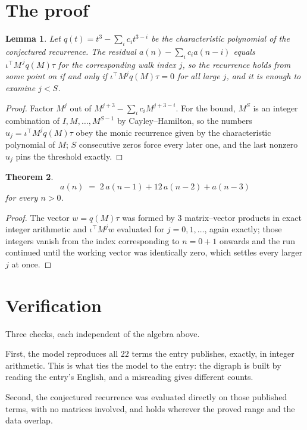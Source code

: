 \documentclass[11pt,a4paper]{article}
\theoremstyle{plain}
\newtheorem{theorem}{Theorem}
\newtheorem{lemma}[theorem]{Lemma}
\theoremstyle{definition}
\begin{document}
\section{The proof}

\begin{lemma}\label{lem:crit}
Let $q(t)=t^{3}-\sum_i c_it^{3-i}$ be the characteristic polynomial of the
conjectured recurrence. The residual $a(n)-\sum_ic_ia(n-i)$ equals
$\iota^{\!\top}M^{\,j}q(M)\tau$ for the corresponding walk index $j$, so the recurrence
holds from some point on if and only if $\iota^{\!\top}M^{j}q(M)\tau=0$ for all large $j$,
and it is enough to examine $j<S$.
\end{lemma}

\begin{proof}
Factor $M^{j}$ out of $M^{j+3}-\sum_ic_iM^{j+3-i}$. For the bound, $M^{S}$
is an integer combination of $I,M,\dots,M^{S-1}$ by Cayley--Hamilton, so the numbers
$u_j=\iota^{\!\top}M^{j}q(M)\tau$ obey the monic recurrence given by the characteristic
polynomial of $M$; $S$ consecutive zeros force every later one, and the last nonzero $u_j$
pins the threshold exactly.
\end{proof}

\begin{theorem}
\[
a(n)\;=\;2\,a(n-1) + 12\,a(n-2) + a(n-3)
\]
for every $n>0$.
\end{theorem}

\begin{proof}
The vector $w=q(M)\tau$ was formed by $3$ matrix--vector products in exact integer
arithmetic and $\iota^{\!\top}M^{j}w$ evaluated for $j=0,1,\dots$, again exactly; those
integers vanish from the index corresponding to $n=0+1$ onwards and the run continued
until the working vector was identically zero, which settles every larger $j$ at once.
\end{proof}

\section{Verification}

Three checks, each independent of the algebra above.

First, the model reproduces all $22$ terms the entry publishes, exactly, in integer
arithmetic. This is what ties the model to the entry: the digraph is built by reading the
entry's English, and a misreading gives different counts.

Second, the conjectured recurrence was evaluated directly on those published terms, with no
matrices involved, and holds wherever the proved range and the data overlap.
\end{document}
